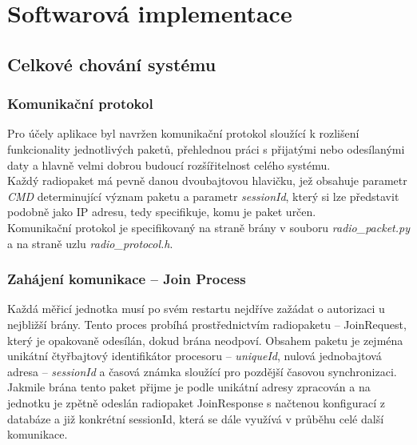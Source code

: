 

\chapter{Softwarová implementace}

\section{Celkové chování systému}

\subsection{Komunikační protokol}
    Pro účely aplikace byl navržen komunikační protokol sloužící k rozlišení funkcionality jednotlivých paketů, přehlednou práci s přijatými nebo odesílanými daty a hlavně velmi dobrou budoucí rozšířitelnost celého systému.\\
    Každý radiopaket má pevně danou dvoubajtovou hlavičku, jež obsahuje  parametr \textit{CMD} determinující význam paketu a parametr \textit{sessionId}, který si lze představit podobně jako IP adresu, tedy specifikuje, komu je paket určen.\\
    Komunikační protokol je specifikovaný na straně brány v souboru \textit{radio\_packet.py} a na straně uzlu \textit{radio\_protocol.h}. 
    
    

\subsection{Zahájení komunikace – Join Process}
    Každá měřicí jednotka musí po svém restartu nejdříve zažádat o autorizaci u nejbližší brány. Tento proces probíhá prostřednictvím radiopaketu – JoinRequest, který je opakovaně odesílán, dokud brána neodpoví. Obsahem paketu je zejména unikátní čtyřbajtový identifikátor procesoru – \textit{uniqueId}, nulová jednobajtová adresa – \textit{sessionId} a časová známka sloužící pro pozdější časovou synchronizaci.\\
    Jakmile brána tento paket přijme je podle unikátní adresy zpracován a na jednotku je zpětně odeslán radiopaket JoinResponse s načtenou konfigurací z databáze a již konkrétní sessionId, která se dále využívá v průběhu celé další komunikace.
    
 
